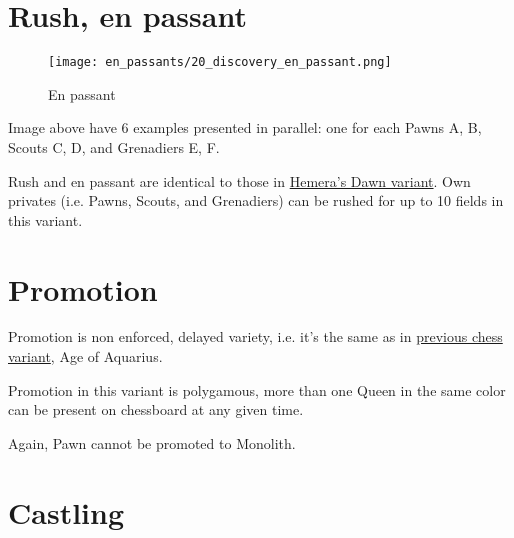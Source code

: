 \clearpage %

\section*{Rush, en passant}
\label{sec:Discovery/Rush, en passant}

\vspace*{-1.4\baselineskip}
\noindent
\begin{figure}[!h]
\texttt{[image: en\_passants/20\_discovery\_en\_passant.png]}
\vspace*{-1.3\baselineskip}
\caption{En passant}
\label{fig:20_discovery_en_passant}
\end{figure}

\vspace*{-0.5\baselineskip}
Image above have 6 examples presented in parallel: one for each Pawns A, B,
Scouts C, D, and Grenadiers E, F.

Rush and en passant are identical to those in
\hyperref[fig:14_hemera_s_dawn_en_passant]{Hemera's Dawn variant}.
Own privates (i.e. Pawns, Scouts, and Grenadiers) can be rushed for up to 10
fields in this variant.

\clearpage %

\section*{Promotion}
\label{sec:Discovery/Promotion}

Promotion is non enforced, delayed variety, i.e. it's the same as in
\hyperref[sec:Age of Aquarius/Promotion]{previous chess variant}, Age of Aquarius.

Promotion in this variant is polygamous, more than one Queen in the same color
can be present on chessboard at any given time.

Again, Pawn cannot be promoted to Monolith.

\clearpage %

\section*{Castling}
\label{sec:Discovery/Castling}

